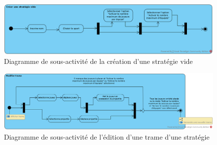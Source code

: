 \begin{figure}[htpb]
    \centering
    \includegraphics[scale=0.60]{fig/sub_activity_diagram_create_strategy.png}
    \caption{Diagramme de sous-activité de la création d'une stratégie vide}
    \label{fig:sub_activity_diagram_create_strategy}
\end{figure}

\begin{figure}[htpb]
    \centering
    \includegraphics[scale=0.60]{fig/sub_activity_diagram_edit_strategy.png}
    \caption{Diagramme de sous-activité de l'édition d'une trame d'une stratégie}
    \label{fig:sub_activity_diagram_edit_strategy}
\end{figure}
